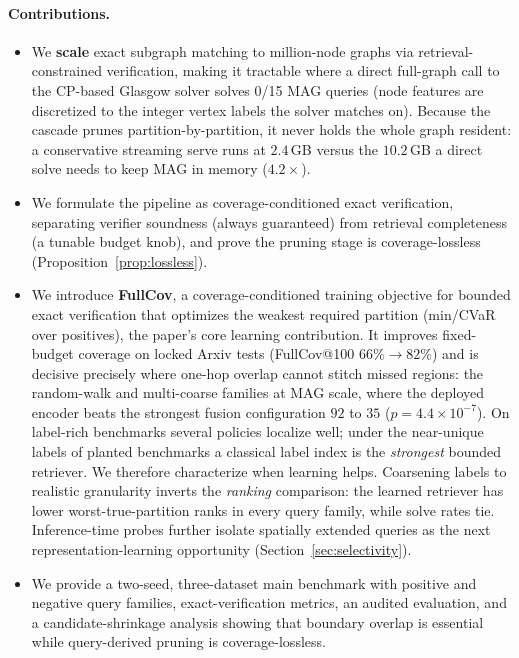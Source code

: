 \documentclass[runningheads]{llncs}
\begin{document}
\paragraph{Contributions.}
\begin{itemize}
    \item We \textbf{scale} exact subgraph matching to million-node graphs via retrieval-constrained verification, making it tractable where a direct full-graph call to the CP-based Glasgow solver solves 0/15 MAG queries (node features are discretized to the integer vertex labels the solver matches on). Because the cascade prunes partition-by-partition, it never holds the whole graph resident: a conservative streaming serve runs at $2.4$\,GB versus the $10.2$\,GB a direct solve needs to keep MAG in memory ($4.2\times$).
    \item We formulate the pipeline as coverage-conditioned exact verification, separating verifier soundness (always guaranteed) from retrieval completeness (a tunable budget knob), and prove the pruning stage is coverage-lossless (Proposition~\ref{prop:lossless}).
    \item We introduce \textbf{FullCov}, a coverage-conditioned training objective for bounded exact verification that optimizes the weakest required partition (min/CVaR over positives), the paper's core learning contribution. It improves fixed-budget coverage on locked Arxiv tests (FullCov@100 $66\%{\to}82\%$) and is decisive precisely where one-hop overlap cannot stitch missed regions: the random-walk and multi-coarse families at MAG scale, where the deployed encoder beats the strongest fusion configuration $92$ to $35$ ($p{=}4.4{\times}10^{-7}$). On label-rich benchmarks several policies localize well; under the near-unique labels of planted benchmarks a classical label index is the \emph{strongest} bounded retriever. We therefore characterize when learning helps. Coarsening labels to realistic granularity inverts the \emph{ranking} comparison: the learned retriever has lower worst-true-partition ranks in every query family, while solve rates tie. Inference-time probes further isolate spatially extended queries as the next representation-learning opportunity (Section~\ref{sec:selectivity}).
    \item We provide a two-seed, three-dataset main benchmark with positive and negative query families, exact-verification metrics, an audited evaluation, and a candidate-shrinkage analysis showing that boundary overlap is essential while query-derived pruning is coverage-lossless.
\end{itemize}
\end{document}
